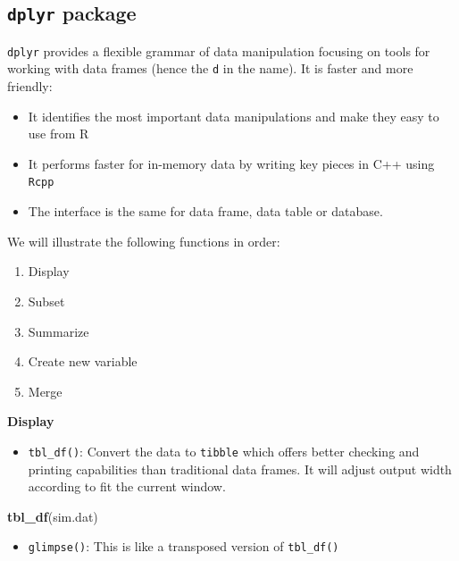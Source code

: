 \documentclass[12pt,]{krantz}
\makeatletter
\newenvironment{Shaded}{\begin{snugshade}}{\end{snugshade}}
\newcommand{\KeywordTok}[1]{\textcolor[rgb]{0.27,0.27,0.27}{\textbf{#1}}}
\newcommand{\NormalTok}[1]{#1}
\providecommand{\tightlist}{%
  \setlength{\itemsep}{0pt}\setlength{\parskip}{0pt}}
\newenvironment{kframe}{%
\medskip{}
\setlength{\fboxsep}{.8em}
 \def\at@end@of@kframe{}%
 \ifinner\ifhmode%
  \def\at@end@of@kframe{\end{minipage}}%
  \begin{minipage}{\columnwidth}%
 \fi\fi%
 \def\FrameCommand##1{\hskip\@totalleftmargin \hskip-\fboxsep
 \colorbox{shadecolor}{##1}\hskip-\fboxsep
     \hskip-\linewidth \hskip-\@totalleftmargin \hskip\columnwidth}%
 \MakeFramed {\advance\hsize-\width
   \@totalleftmargin\z@ \linewidth\hsize
   \@setminipage}}%
 {\par\unskip\endMakeFramed%
 \at@end@of@kframe}
\renewenvironment{Shaded}{\begin{kframe}}{\end{kframe}}
\makeatother
\begin{document}
\hypertarget{dplyr-package}{%
\subsection{\texorpdfstring{\texttt{dplyr} package}{dplyr package}}\label{dplyr-package}}

\texttt{dplyr} provides a flexible grammar of data manipulation focusing on tools for working with data frames (hence the \texttt{d} in the name). It is faster and more friendly:

\begin{itemize}
\tightlist
\item
  It identifies the most important data manipulations and make they easy to use from R
\item
  It performs faster for in-memory data by writing key pieces in C++ using \texttt{Rcpp}
\item
  The interface is the same for data frame, data table or database.
\end{itemize}

We will illustrate the following functions in order:

\begin{enumerate}
\def\labelenumi{\arabic{enumi}.}
\tightlist
\item
  Display
\item
  Subset
\item
  Summarize
\item
  Create new variable
\item
  Merge
\end{enumerate}

\textbf{Display}

\begin{itemize}
\tightlist
\item
  \texttt{tbl\_df()}: Convert the data to \texttt{tibble} which offers better checking and printing capabilities than traditional data frames. It will adjust output width according to fit the current window.
\end{itemize}

\begin{Shaded}
\begin{Highlighting}[]
\KeywordTok{tbl_df}\NormalTok{(sim.dat)}
\end{Highlighting}
\end{Shaded}

\begin{itemize}
\tightlist
\item
  \texttt{glimpse()}: This is like a transposed version of \texttt{tbl\_df()}
\end{itemize}
\end{document}
